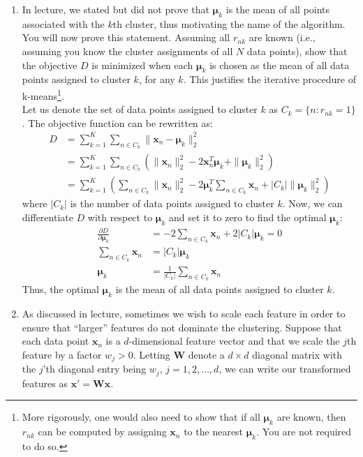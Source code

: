 \documentclass[a3paper,12pt]{extarticle} %
\begin{document}
\begin{enumerate}
    \item In lecture, we stated but did not prove that $\boldsymbol{\mu}_k$ is the mean of all points associated with the $k$th cluster, thus motivating the name of the algorithm. You will now prove this statement. Assuming all $r_{nk}$ are known (i.e., assuming you know the cluster assignments of all $N$ data points), show that the objective $D$ is minimized when each $\boldsymbol{\mu}_k$ is chosen as the mean of all data points assigned to cluster $k$, for any $k$. This justifies the iterative procedure of k-means\footnote{More rigorously, one would also need to show that if all $\boldsymbol{\mu}_k$ are known, then $r_{nk}$ can be computed by assigning $\mathbf{x}_n$ to the nearest $\boldsymbol{\mu}_k$. You are not required to do so.}.
\\
Let us denote the set of data points assigned to cluster $k$ as $C_k = \{n: r_{nk} = 1\}$. The objective function can be rewritten as:
\begin{align}
D &= \sum_{k=1}^K \sum_{n \in C_k} \|\mathbf{x}_n - \boldsymbol{\mu}_k\|^2_2\\
&= \sum_{k=1}^K \sum_{n \in C_k} \left( \|\mathbf{x}_n\|^2_2 - 2\mathbf{x}_n^T\boldsymbol{\mu}_k + \|\boldsymbol{\mu}_k\|^2_2 \right)\\
&= \sum_{k=1}^K \left( \sum_{n \in C_k} \|\mathbf{x}_n\|^2_2 - 2\boldsymbol{\mu}_k^T \sum_{n \in C_k} \mathbf{x}_n + |C_k| \|\boldsymbol{\mu}_k\|^2_2 \right)
\end{align}
where $|C_k|$ is the number of data points assigned to cluster $k$.
Now, we can differentiate $D$ with respect to $\boldsymbol{\mu}_k$ and set it to zero to find the optimal $\boldsymbol{\mu}_k$:
\begin{align}
\frac{\partial D}{\partial \boldsymbol{\mu}_k} &= -2 \sum_{n \in C_k} \mathbf{x}_n + 2|C_k|\boldsymbol{\mu}_k = 0\\
\sum_{n \in C_k} \mathbf{x}_n &= |C_k|\boldsymbol{\mu}_k\\
\boldsymbol{\mu}_k &= \frac{1}{|C_k|} \sum_{n \in C_k} \mathbf{x}_n
\end{align}
Thus, the optimal $\boldsymbol{\mu}_k$ is the mean of all data points assigned to cluster $k$.
    \item As discussed in lecture, sometimes we wish to scale each feature in order to ensure that ``larger'' features do not dominate the clustering. Suppose that each data point $\mathbf{x}_n$ is a $d$-dimensional feature vector and that we scale the $j$th feature by a factor $w_j > 0$. Letting $\mathbf{W}$ denote a $d \times d$ diagonal matrix with the $j$'th diagonal entry being $w_j$, $j = 1, 2, \ldots, d$, we can write our transformed features as $\mathbf{x}' = \mathbf{W}\mathbf{x}$.


\end{enumerate}
\end{document}
